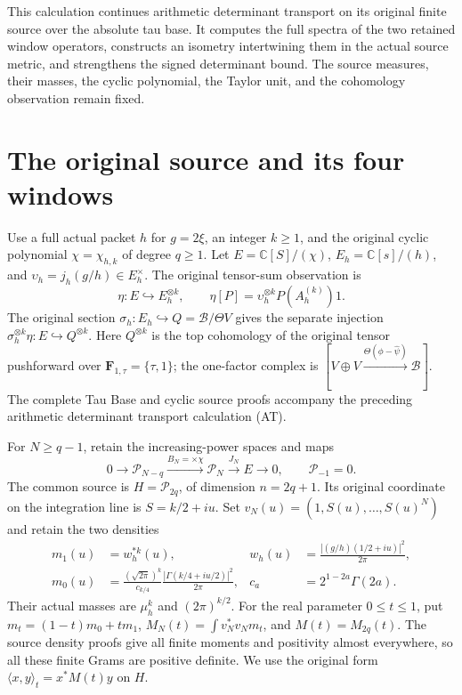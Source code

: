 \newcommand{\C}{\mathbb C}
\newcommand{\Tr}{\operatorname{Tr}}
\newcommand{\cP}{\mathcal P}



This calculation continues arithmetic determinant transport on its original
finite source over the absolute tau base. It computes the full spectra of
the two retained window operators, constructs an isometry intertwining
them in the actual source metric, and strengthens the signed determinant
bound. The source measures, their masses, the cyclic polynomial, the
Taylor unit, and the cohomology observation remain fixed.

\section{The original source and its four windows}

Use a full actual packet $h$ for $g=2\xi$, an integer $k\ge1$, and the
original cyclic polynomial $\chi=\chi_{h,k}$ of degree $q\ge1$.
Let $E=\C[S]/(\chi)$, $E_h=\C[s]/(h)$, and
$\upsilon_h=j_h(g/h)\in E_h^\times$.
The original tensor-sum observation is
\[
 \eta:E\hookrightarrow E_h^{\otimes k},\qquad
 \eta[P]=\upsilon_h^{\otimes k}P(A_h^{(k)})1.
 \tag{AW1}
\]
The original section $\sigma_h:E_h\hookrightarrow
Q=\mathscr B/\Theta V$ gives the separate injection
$\sigma_h^{\otimes k}\eta:E\hookrightarrow Q^{\otimes k}$.
Here $Q^{\otimes k}$ is the top cohomology of the original tensor
pushforward over $\mathbf F_{1,\tau}=\{\tau,1\}$; the one-factor
complex is $[V\oplus V\xrightarrow{\Theta(\phi-\widehat\psi)}
\mathscr B]$. The complete Tau Base and cyclic source proofs accompany
the preceding arithmetic determinant transport calculation (AT).

For $N\ge q-1$, retain the increasing-power spaces and maps
\[
 0\longrightarrow\cP_{N-q}\xrightarrow{B_N=\times\chi}
 \cP_N\xrightarrow{J_N}E\longrightarrow0,
 \qquad \cP_{-1}=0.
 \tag{AW2}
\]
The common source is $H=\cP_{2q}$, of dimension $n=2q+1$.
Its original coordinate on the integration line is $S=k/2+iu$.
Set $v_N(u)=(1,S(u),\ldots,S(u)^N)$ and retain the two densities
\[
 \begin{aligned}
 m_1(u)&=w_h^{*k}(u),&
 w_h(u)&=\frac{|(g/h)(1/2+iu)|^2}{2\pi},\\
 m_0(u)&=\frac{(\sqrt{2\pi})^k}{c_{k/4}}
              \frac{|\Gamma(k/4+iu/2)|^2}{2\pi},&
 c_a&=2^{1-2a}\Gamma(2a).
 \end{aligned}
 \tag{AW3}
\]
Their actual masses are $\mu_h^k$ and $(2\pi)^{k/2}$.
For the real parameter $0\le t\le1$, put
$m_t=(1-t)m_0+tm_1$, $M_N(t)=\int v_N^*v_Nm_t$, and
$M(t)=M_{2q}(t)$. The source density proofs give all finite moments
and positivity almost everywhere, so all these finite Grams are
positive definite. We use the original form
$\langle x,y\rangle_t=x^*M(t)y$ on $H$.

